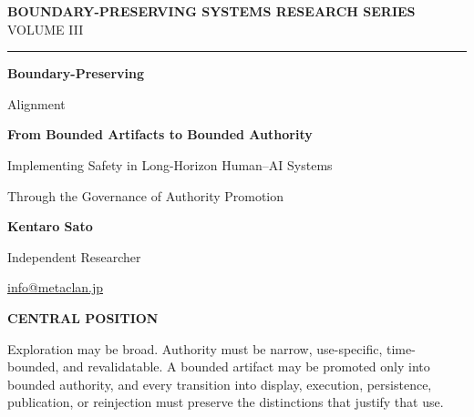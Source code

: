 \documentclass[10pt,a4paper]{article}
\begin{document}
\hypersetup{pageanchor=false}
\begin{titlepage}
\thispagestyle{empty}
\sffamily

{\fontsize{8.2}{10}\selectfont\bfseries\color{ReportNavy} BOUNDARY-PRESERVING SYSTEMS RESEARCH SERIES}\hfill
{\fontsize{8.2}{10}\selectfont\color{ReportTeal} VOLUME III}

\vspace{4mm}
{\color{ReportRule}\rule{\textwidth}{0.7pt}}

\vspace{14mm}
{\fontsize{29}{33}\selectfont\bfseries\color{ReportInk}
Boundary-Preserving\par
Alignment\par}

\vspace{7mm}
{\fontsize{11.4}{15}\selectfont\bfseries\color{ReportTeal}
From Bounded Artifacts to Bounded Authority\par}

\vspace{3mm}
{\fontsize{10.2}{13.5}\selectfont\color{ReportMuted}
Implementing Safety in Long-Horizon Human--AI Systems\par
Through the Governance of Authority Promotion\par}

\vspace{12mm}
{\fontsize{11}{14}\selectfont\bfseries Kentaro Sato\par}
{\fontsize{9}{12}\selectfont\color{ReportMuted}Independent Researcher\par
\href{mailto:info@metaclan.jp}{info@metaclan.jp}\par}

\vfill

\begin{reportclaim}
{\sffamily\fontsize{8}{10}\selectfont\bfseries\color{ReportTeal} CENTRAL POSITION}\par\smallskip
{\rmfamily\fontsize{10.4}{13.8}\selectfont\raggedright
Exploration may be broad. Authority must be narrow, use-specific, time-bounded, and \mbox{revalidatable}. A bounded artifact may be promoted only into bounded authority, and every transition into display, execution, persistence, publication, or reinjection must preserve the distinctions that justify that use.\par}
\end{reportclaim}


\end{titlepage}
\end{document}
